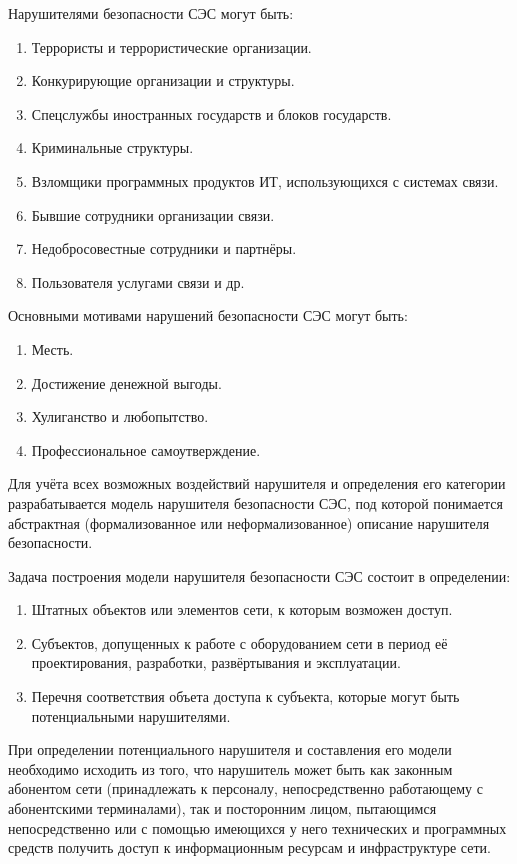 \documentclass[12pt, russian, oneside, article]{ncc}
\begin{document}
Нарушителями безопасности СЭС могут быть:
\begin{enumerate}
\item Террористы и террористические организации.
\item Конкурирующие организации и структуры.
\item Спецслужбы иностранных государств и блоков государств.
\item Криминальные структуры.
\item Взломщики программных продуктов ИТ, использующихся с системах связи.
\item Бывшие сотрудники организации связи.
\item Недобросовестные сотрудники и партнёры.
\item Пользователя услугами связи и др.
\end{enumerate}

Основными мотивами нарушений безопасности СЭС могут быть:
\begin{enumerate}
\item Месть.
\item Достижение денежной выгоды.
\item Хулиганство и любопытство.
\item Профессиональное самоутверждение.
\end{enumerate}

Для учёта всех возможных воздействий нарушителя и определения его категории разрабатывается модель нарушителя безопасности СЭС, под которой понимается абстрактная (формализованное или неформализованное) описание нарушителя безопасности.

Задача построения модели нарушителя безопасности СЭС состоит в определении:
\begin{enumerate}
\item Штатных объектов или элементов сети, к которым возможен доступ.
\item Субъектов, допущенных к работе с оборудованием сети в период её проектирования, разработки, развёртывания и эксплуатации.
\item Перечня соответствия объета доступа к субъекта, которые могут быть потенциальными нарушителями.
\end{enumerate}

При определении потенциального нарушителя и составления его модели необходимо исходить из того, что нарушитель может быть как законным абонентом сети (принадлежать к персоналу, непосредственно работающему с абонентскими терминалами), так и посторонним лицом, пытающимся непосредственно или с помощью имеющихся у него технических и программных средств получить доступ к информационным ресурсам и инфраструктуре сети.
\end{document}
